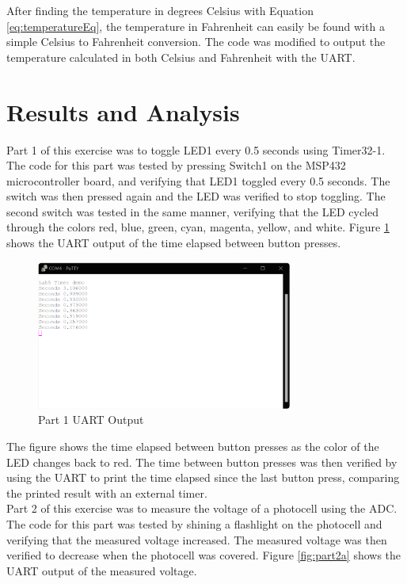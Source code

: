 \documentclass[CMPE]{KGCOEReport}
\begin{document}
After finding the temperature in degrees Celsius with Equation \ref{eq:temperatureEq}, the temperature in Fahrenheit can easily be found with a simple Celsius to Fahrenheit conversion. The code was modified to output the temperature calculated in both Celsius and Fahrenheit with the UART.

\section*{Results and Analysis}

Part 1 of this exercise was to toggle LED1 every 0.5 seconds using Timer32-1. The code for this part was tested by pressing Switch1 on the MSP432 microcontroller board, and verifying that LED1 toggled every 0.5 seconds. The switch was then pressed again and the LED was verified to stop toggling. The second switch was tested in the same manner, verifying that the LED cycled through the colors red, blue, green, cyan, magenta, yellow, and white. Figure \ref{fig:part1} shows the UART output of the time elapsed between button presses.

\begin{figure}[H]
    \centering
    \includegraphics[width=0.75\textwidth]{part1.png}
    \caption{Part 1 UART Output}
    \label{fig:part1}
\end{figure}

The figure shows the time elapsed between button presses as the color of the LED changes back to red. The time between button presses was then verified by using the UART to print the time elapsed since the last button press, comparing the printed result with an external timer.\\

Part 2 of this exercise was to measure the voltage of a photocell using the ADC. The code for this part was tested by shining a flashlight on the photocell and verifying that the measured voltage increased. The measured voltage was then verified to decrease when the photocell was covered. Figure \ref{fig:part2a} shows the UART output of the measured voltage.
\end{document}
